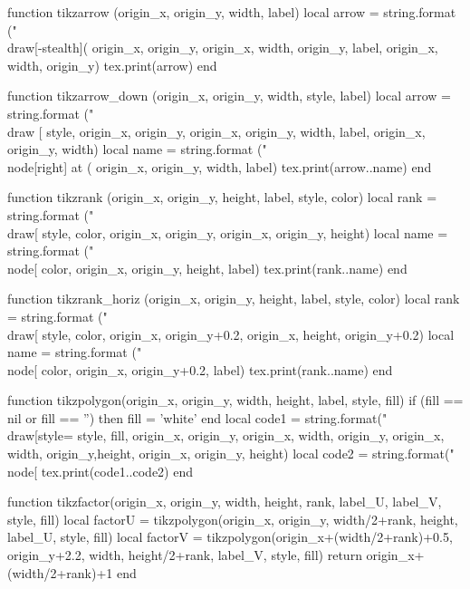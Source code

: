 \begin{luacode*}
{function tikzarrow (origin_x, origin_y, width, label)
	 local arrow = string.format ("\\draw[-stealth](%
																origin_x, origin_y, origin_x, width, origin_y, label, origin_x, width, origin_y)
	 tex.print(arrow)
end

function tikzarrow_down (origin_x, origin_y, width, style, label)
	 local arrow = string.format ("\\draw [%
																style, origin_x, origin_y, origin_x, origin_y, width, label, origin_x, origin_y, width)
	 local name = string.format ("\\node[right] at (%
															 origin_x, origin_y, width, label)
	 tex.print(arrow..name)
end

function tikzrank (origin_x, origin_y, height, label, style, color)
	 local rank = string.format ("\\draw[%
															 style, color, origin_x, origin_y, origin_x, origin_y, height)
	 local name = string.format ("\\node[%
															 color, origin_x, origin_y, height, label)
	 tex.print(rank..name)
end

function tikzrank_horiz (origin_x, origin_y, height, label, style, color)
	 local rank = string.format ("\\draw[%
															 style, color, origin_x, origin_y+0.2, origin_x, height, origin_y+0.2)
	 local name = string.format ("\\node[%
															 color, origin_x, origin_y+0.2, label)
	 tex.print(rank..name)
end

function tikzpolygon(origin_x, origin_y, width, height, label, style, fill)
	 if (fill == nil or fill == '') then
			fill = 'white'
	 end
	 local code1 = string.format("\\draw[style=%
															 style, fill, origin_x, origin_y, origin_x, width, origin_y, origin_x, width,
															 origin_y,height, origin_x, origin_y, height)
	 local code2 =
			string.format("\\node[%
	 tex.print(code1..code2)
end

function tikzfactor(origin_x, origin_y, width, height, rank, label_U,
										label_V,
										style, fill)
	 local factorU = tikzpolygon(origin_x, origin_y, width/2+rank, height,
															 label_U,
															 style, fill)
	 local factorV = tikzpolygon(origin_x+(width/2+rank)+0.5, origin_y+2.2, width,
															 height/2+rank, label_V,
															 style, fill)
	 return origin_x+(width/2+rank)+1
end

}
\end{luacode*}
